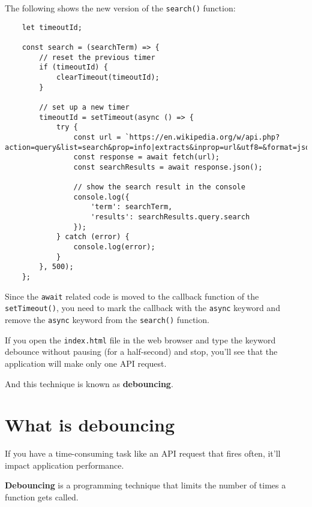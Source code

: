\documentclass[11pt]{article}
\begin{document}
\noindent
The following shows the new version of the \verb|search()| function:

\begin{lstlisting}
    let timeoutId;

    const search = (searchTerm) => {
        // reset the previous timer
        if (timeoutId) {
            clearTimeout(timeoutId);
        }

        // set up a new timer
        timeoutId = setTimeout(async () => {
            try {
                const url = `https://en.wikipedia.org/w/api.php?action=query&list=search&prop=info|extracts&inprop=url&utf8=&format=json&origin=*&srlimit=10&srsearch=${searchTerm}`;
                const response = await fetch(url);
                const searchResults = await response.json();

                // show the search result in the console
                console.log({
                    'term': searchTerm,
                    'results': searchResults.query.search
                });
            } catch (error) {
                console.log(error);
            }
        }, 500);
    };
\end{lstlisting}

\noindent
Since the \verb|await| related code is moved to the callback function of
the \verb|setTimeout()|, you need to mark the callback with the \verb|async| keyword
and remove the \verb|async| keyword from the \verb|search()| function.
\newline

\noindent
If you open the \verb|index.html| file in the web browser and type the keyword
debounce without pausing (for a half-second) and stop, you'll see
that the application will make only one API request.
\newline

\noindent
And this technique is known as \textbf{debouncing}.

\section*{What is debouncing}

If you have a time-consuming task like an API request that fires often,
it'll impact application performance.
\newline

\noindent
\textbf{Debouncing} is a programming technique that limits the number of
times a function gets called.
\end{document}
